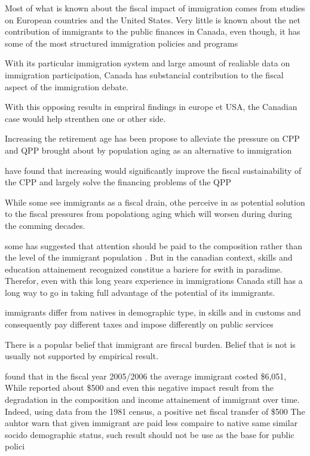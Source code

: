   Most of what is known about the fiscal impact of immigration comes from studies on European countries and the United States. Very little is known about the net contribution of immigrants to the public finances in Canada, even though, it has some of the most structured immigration policies and programs

  With its particular immigration system and large amount of realiable data on immigration participation, Canada has substancial contribution to the fiscal aspect of the immigration debate.

  With this opposing results in empriral findings in europe et USA, the Canadian case would help strenthen one or other side.

  Increasing the retirement age has been propose  to alleviate the pressure on CPP and QPP brought about by population aging as an alternative to immigration \citep{Hering.Klassen.2010}

  \citep{Hering.Klassen.2010} have found that increasing would significantly improve the fiscal sustainability of the CPP and largely solve the financing problems of the QPP

  While some see immigrants as a fiscal drain, othe perceive in as potential solution to the fiscal pressures from popolationg aging \citep{RePEc:nbr:nberch:10849} which will worsen during during the comming decades.

  some has suggested that attention should be paid to the composition rather than the level of the immigrant population \citep{RePEc:nbr:nberch:10849}. But in the canadian context, skills and education attainement recognized constitue a bariere for swith in paradime. Therefor, even with this long years experience in immigrations Canada still has a long way to go in taking full advantage of the potential of its immigrants.








  immigrants differ from natives in demographic type, in skills and in customs and consequently pay different taxes and impose differently on public services \citep{Preston:2014uw}

  There is a popular belief that immigrant are firscal burden. Belief that is not is usually not supported by empirical result.

  \citep{Grubel:2012wo} found that in the fiscal year 2005/2006 the average immigrant costed \$6,051,  While \citep{Javdani:2013gu} reported about \$500 and even this negative impact result from the degradation in the composition and income attainement of immigrant over time. Indeed, using data from the 1981 census, \citep{Akbari:1989fh} a positive net fiscal transfer of \$500
  The auhtor warn that given immigrant are paid less compaire to native same similar socido demographic status, such result should not be use as the base for public polici

